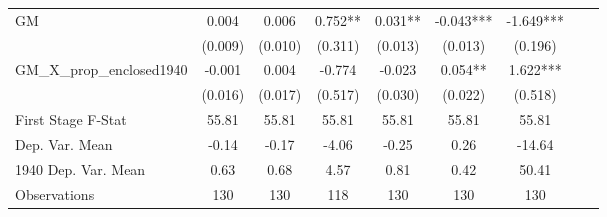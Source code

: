 \begin{tabular}{l*{8}{c}}
\cmidrule(lr){1-7}
GM              &    0.004   &    0.006   &    0.752** &    0.031** &   -0.043***&   -1.649***\\
                &  (0.009)   &  (0.010)   &  (0.311)   &  (0.013)   &  (0.013)   &  (0.196)   \\
\addlinespace
GM\_X\_prop\_enclosed1940&   -0.001   &    0.004   &   -0.774   &   -0.023   &    0.054** &    1.622***\\
                &  (0.016)   &  (0.017)   &  (0.517)   &  (0.030)   &  (0.022)   &  (0.518)   \\
\midrule
First Stage F-Stat&    55.81   &    55.81   &    55.81   &    55.81   &    55.81   &    55.81   \\
Dep. Var. Mean  &    -0.14   &    -0.17   &    -4.06   &    -0.25   &     0.26   &   -14.64   \\
1940 Dep. Var. Mean&     0.63   &     0.68   &     4.57   &     0.81   &     0.42   &    50.41   \\
Observations    &      130   &      130   &      118   &      130   &      130   &      130   \\
 \bottomrule \end{tabular}
